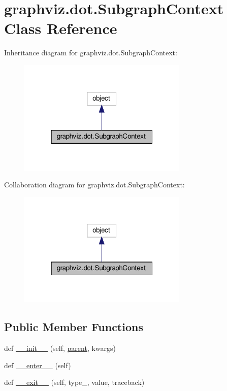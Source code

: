 \hypertarget{classgraphviz_1_1dot_1_1SubgraphContext}{}\section{graphviz.\+dot.\+Subgraph\+Context Class Reference}
\label{classgraphviz_1_1dot_1_1SubgraphContext}


Inheritance diagram for graphviz.\+dot.\+Subgraph\+Context\+:
\nopagebreak
\begin{figure}[H]
\begin{center}
\leavevmode
\includegraphics[width=229pt]{classgraphviz_1_1dot_1_1SubgraphContext__inherit__graph}
\end{center}
\end{figure}


Collaboration diagram for graphviz.\+dot.\+Subgraph\+Context\+:
\nopagebreak
\begin{figure}[H]
\begin{center}
\leavevmode
\includegraphics[width=229pt]{classgraphviz_1_1dot_1_1SubgraphContext__coll__graph}
\end{center}
\end{figure}
\subsection*{Public Member Functions}
\begin{DoxyCompactItemize}
\item 
def \hyperlink{classgraphviz_1_1dot_1_1SubgraphContext_a21decf23b0de98b7607e862e18b0ed0f}{\+\_\+\+\_\+init\+\_\+\+\_\+} (self, \hyperlink{classgraphviz_1_1dot_1_1SubgraphContext_aa3bf4e4942c5284cef208a9860a505bc}{parent}, kwargs)
\item 
def \hyperlink{classgraphviz_1_1dot_1_1SubgraphContext_a8460605457b3e9e9ab23e64f590d8c35}{\+\_\+\+\_\+enter\+\_\+\+\_\+} (self)
\item 
def \hyperlink{classgraphviz_1_1dot_1_1SubgraphContext_acac3a4f37565d7aa43934e8566b318f3}{\+\_\+\+\_\+exit\+\_\+\+\_\+} (self, type\+\_\+, value, traceback)
\end{DoxyCompactItemize}
